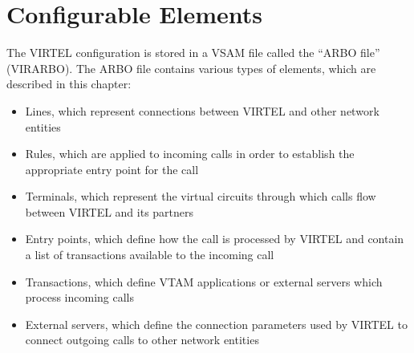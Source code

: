 \documentclass[letterpaper,10pt,english]{sphinxmanual}
\begin{document}
\section{Configurable Elements}
\label{\detokenize{connectivity_guide:configurable-elements}}
\sphinxAtStartPar
The VIRTEL configuration is stored in a VSAM file called the “ARBO file” (VIRARBO). The ARBO file contains various types of elements, which are described in this chapter:
\begin{itemize}
\item {} 
\sphinxAtStartPar
Lines, which represent connections between VIRTEL and other network entities

\item {} 
\sphinxAtStartPar
Rules, which are applied to incoming calls in order to establish the appropriate entry point for the call

\item {} 
\sphinxAtStartPar
Terminals, which represent the virtual circuits through which calls flow between VIRTEL and its partners

\item {} 
\sphinxAtStartPar
Entry points, which define how the call is processed by VIRTEL and contain a list of transactions available to the incoming call

\item {} 
\sphinxAtStartPar
Transactions, which define VTAM applications or external servers which process incoming calls

\item {} 
\sphinxAtStartPar
External servers, which define the connection parameters used by VIRTEL to connect outgoing calls to other network entities

\end{itemize}

\sphinxAtStartPar
{}

\sphinxAtStartPar
{}
\end{document}
